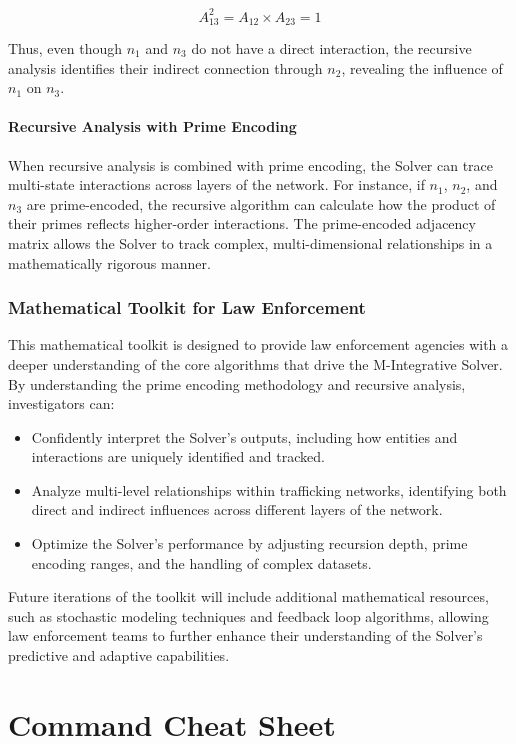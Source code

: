 \documentclass[%
 preprint, linenumbers,
 amsmath,amssymb,
 aps, physrev,
]{revtex4-2}
\begin{document}
\[
A^2_{13} = A_{12} \times A_{23} = 1
\]

Thus, even though \( n_1 \) and \( n_3 \) do not have a direct interaction, the recursive analysis identifies their indirect connection through \( n_2 \), revealing the influence of \( n_1 \) on \( n_3 \).

\paragraph{Recursive Analysis with Prime Encoding}
When recursive analysis is combined with prime encoding, the Solver can trace multi-state interactions across layers of the network. For instance, if \( n_1 \), \( n_2 \), and \( n_3 \) are prime-encoded, the recursive algorithm can calculate how the product of their primes reflects higher-order interactions. The prime-encoded adjacency matrix allows the Solver to track complex, multi-dimensional relationships in a mathematically rigorous manner.

\subsubsection*{Mathematical Toolkit for Law Enforcement}

This mathematical toolkit is designed to provide law enforcement agencies with a deeper understanding of the core algorithms that drive the M-Integrative Solver. By understanding the prime encoding methodology and recursive analysis, investigators can:
\begin{itemize}
    \item Confidently interpret the Solver's outputs, including how entities and interactions are uniquely identified and tracked.
    \item Analyze multi-level relationships within trafficking networks, identifying both direct and indirect influences across different layers of the network.
    \item Optimize the Solver’s performance by adjusting recursion depth, prime encoding ranges, and the handling of complex datasets.
\end{itemize}

Future iterations of the toolkit will include additional mathematical resources, such as stochastic modeling techniques and feedback loop algorithms, allowing law enforcement teams to further enhance their understanding of the Solver's predictive and adaptive capabilities.

\section*{Command Cheat Sheet}
\end{document}
